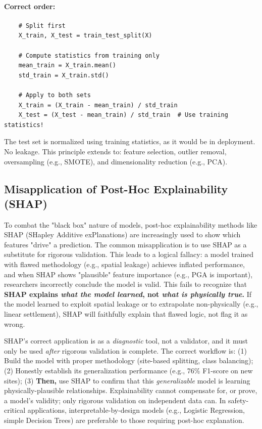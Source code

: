 \documentclass[12pt]{article}
\begin{document}
\paragraph{Correct order:}
\begin{lstlisting}
	# Split first
	X_train, X_test = train_test_split(X)
	
	# Compute statistics from training only
	mean_train = X_train.mean()
	std_train = X_train.std()
	
	# Apply to both sets
	X_train = (X_train - mean_train) / std_train
	X_test = (X_test - mean_train) / std_train  # Use training statistics!
\end{lstlisting}

The test set is normalized using training statistics, as it would be in deployment. No leakage. This principle extends to: feature selection, outlier removal, oversampling (e.g., SMOTE), and dimensionality reduction (e.g., PCA).

\subsection{Misapplication of Post-Hoc Explainability (SHAP)}
To combat the "black box" nature of models, post-hoc explainability methods like SHAP (SHapley Additive exPlanations) are increasingly used to show which features "drive" a prediction. The common misapplication is to use SHAP as a substitute for rigorous validation. This leads to a logical fallacy: a model trained with flawed methodology (e.g., spatial leakage) achieves inflated performance, and when SHAP shows "plausible" feature importance (e.g., PGA is important), researchers incorrectly conclude the model is valid. This fails to recognize that \textbf{SHAP explains \textit{what the model learned}, not \textit{what is physically true}.} If the model learned to exploit spatial leakage or to extrapolate non-physically (e.g., linear settlement), SHAP will faithfully explain that flawed logic, not flag it as wrong.

SHAP's correct application is as a \textit{diagnostic} tool, not a validator, and it must only be used \textit{after} rigorous validation is complete. The correct workflow is: (1) Build the model with proper methodology (site-based splitting, class balancing); (2) Honestly establish its generalization performance (e.g., 76\% F1-score on new sites); (3) \textbf{Then,} use SHAP to confirm that this \textit{generalizable} model is learning physically-plausible relationships. Explainability cannot compensate for, or prove, a model's validity; only rigorous validation on independent data can. In safety-critical applications, interpretable-by-design models (e.g., Logistic Regression, simple Decision Trees) are preferable to those requiring post-hoc explanation.
\end{document}
